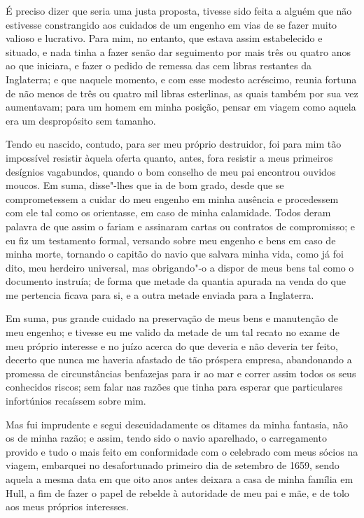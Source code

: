 É preciso dizer que seria uma justa proposta, tivesse sido feita a
alguém que não estivesse constrangido aos cuidados de um engenho em vias
de se fazer muito valioso e lucrativo. Para mim, no entanto, que estava
assim estabelecido e situado, e nada tinha a fazer senão dar seguimento
por mais três ou quatro anos ao que iniciara, e fazer o pedido de
remessa das cem libras restantes da Inglaterra; e que naquele momento, e
com esse modesto acréscimo, reunia fortuna de não menos de três ou
quatro mil libras esterlinas, as quais também por sua vez aumentavam;
para um homem em minha posição, pensar em viagem como aquela era um
despropósito sem tamanho.

Tendo eu nascido, contudo, para ser meu próprio destruidor, foi para mim
tão impossível resistir àquela oferta quanto, antes, fora resistir a
meus primeiros desígnios vagabundos, quando o bom conselho de meu pai
encontrou ouvidos moucos. Em suma, disse"-lhes que ia de bom grado, desde
que se comprometessem a cuidar do meu engenho em minha ausência e
procedessem com ele tal como os orientasse, em caso de minha calamidade.
Todos deram palavra de que assim o fariam e assinaram cartas ou
contratos de compromisso; e eu fiz um testamento formal, versando sobre
meu engenho e bens em caso de minha morte, tornando o capitão do navio
que salvara minha vida, como já foi dito, meu herdeiro universal, mas
obrigando"-o a dispor de meus bens tal como o documento instruía; de
forma que metade da quantia apurada na venda do que me pertencia ficava
para si, e a outra metade enviada para a Inglaterra.

Em suma, pus grande cuidado na preservação de meus bens e manutenção de
meu engenho; e tivesse eu me valido da metade de um tal recato no exame
de meu próprio interesse e no juízo acerca do que deveria e não deveria
ter feito, decerto que nunca me haveria afastado de tão próspera
empresa, abandonando a promessa de circunstâncias benfazejas para ir ao
mar e correr assim todos os seus conhecidos riscos; sem falar nas razões
que tinha para esperar que particulares infortúnios recaíssem sobre mim.

Mas fui imprudente e segui descuidadamente os ditames da minha fantasia,
não os de minha razão; e assim, tendo sido o navio aparelhado, o
carregamento provido e tudo o mais feito em conformidade com o celebrado
com meus sócios na viagem, embarquei no desafortunado primeiro dia de
setembro de 1659, sendo aquela a mesma data em que oito anos antes
deixara a casa de minha família em Hull, a fim de fazer o papel de
rebelde à autoridade de meu pai e mãe, e de tolo aos meus próprios
interesses.

